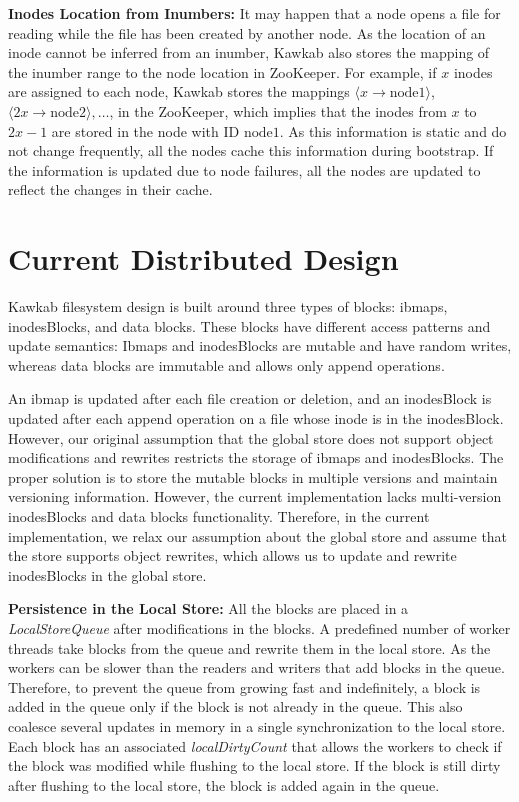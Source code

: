 \documentclass[]{article}
\newcommand{\subtopic}[1]{\vspace{1.5pt} \noindent \textbf{#1}}
\begin{document}
\subtopic{Inodes Location from Inumbers:} It may happen that a node opens a
file for reading while the file has been created by another node. As the
location of an inode cannot be inferred from an inumber, Kawkab also stores the
mapping of the inumber range to the node location in ZooKeeper.  For example,
if $x$ inodes are assigned to each node, Kawkab stores the mappings $\langle x
\to \mathrm{node1} \rangle$, $\langle 2x \to \mathrm{node2} \rangle, \ldots$,
in the ZooKeeper, which implies that the inodes from $x$ to $2x-1$ are stored
in the node with ID $\mathrm{node1}$. As this information is static and do not
change frequently, all the nodes cache this information during bootstrap. If
the information is updated due to node failures, all the nodes are updated to
reflect the changes in their cache.



\section{Current Distributed Design}

Kawkab filesystem design is built around three types of blocks: ibmaps,
inodesBlocks, and data blocks. These blocks have different access patterns and
update semantics: Ibmaps and inodesBlocks are mutable and have random writes,
whereas data blocks are immutable and allows only append operations. 

An ibmap is updated after each file creation or deletion, and an inodesBlock
is updated after each append operation on a file whose inode is in the
inodesBlock.  However, our original assumption that the global store does not
support object modifications and rewrites restricts the storage of ibmaps and
inodesBlocks. The proper solution is to store the mutable blocks in multiple
versions and maintain versioning information. However, the current
implementation lacks multi-version inodesBlocks and data blocks functionality.
Therefore, in the current implementation, we relax our assumption about the
global store and assume that the store supports object rewrites, which allows
us to update and rewrite inodesBlocks in the global store.



\subtopic{Persistence in the Local Store:} All the blocks are placed in a
\textit{LocalStoreQueue} after modifications in the blocks. A predefined number
of worker threads take blocks from the queue and rewrite them in the local
store.  As the workers can be slower than the readers and writers that add
blocks in the queue. Therefore, to prevent the queue from growing fast and
indefinitely, a block is added in the queue only if the block is not already in
the queue. This also coalesce several updates in memory in a single
synchronization to the local store.  Each block has an associated
\textit{localDirtyCount} that allows the workers to check if the block was modified
while flushing to the local store. If the block is still dirty after flushing
to the local store, the block is added again in the queue. 
\end{document}
